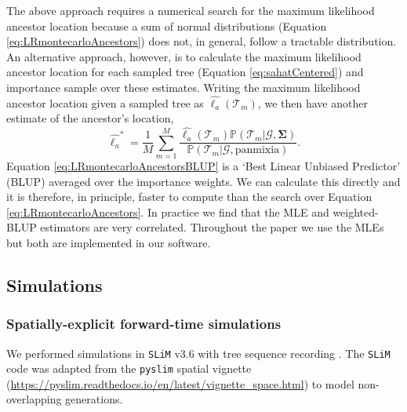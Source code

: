\documentclass[12pt]{article}
\begin{document}
The above approach requires a numerical search for the maximum likelihood ancestor location because a sum of normal distributions (Equation \eqref{eq:LRmontecarloAncestors}) does not, in general, follow a tractable distribution.
An alternative approach, however, is to calculate the maximum likelihood ancestor location for each sampled tree (Equation \eqref{eq:sahatCentered}) and importance sample over these estimates.
Writing the maximum likelihood ancestor location given a sampled tree as $\widehat{\bm{\ell}_a}(\mathcal{T}_m)$, we then have another estimate of the ancestor's location,
\begin{equation}\label{eq:LRmontecarloAncestorsBLUP}
\widehat{\bm{\ell}_a}^* = \frac{1}{M} \sum_{m=1}^{M} \frac{ \widehat{\bm{\ell}_a}(\mathcal{T}_m) \mathbb{P}(\mathcal{T}_m | \mathcal{G}, \mathbf{\Sigma})}{\mathbb{P}(\mathcal{T}_m | \mathcal{G},\mathrm{panmixia})}.
\end{equation}
Equation \eqref{eq:LRmontecarloAncestorsBLUP} is a `Best Linear Unbiased Predictor' (BLUP) averaged over the importance weights. 
We can calculate this directly and it is therefore, in principle, faster to compute than the search over Equation \eqref{eq:LRmontecarloAncestors}. 
In practice we find that the MLE and weighted-BLUP estimators are very correlated. 
Throughout the paper we use the MLEs but both are implemented in our software.

\subsection*{Simulations}

\subsubsection*{Spatially-explicit forward-time simulations}

We performed simulations in \texttt{SLiM} v3.6 \citep{haller2019slim} with tree sequence recording \citep{haller2019tree}.
The \texttt{SLiM} code was adapted from the \texttt{pyslim} spatial vignette (\url{https://pyslim.readthedocs.io/en/latest/vignette_space.html}) to model non-overlapping generations. 
\end{document}
